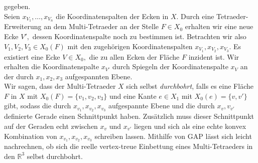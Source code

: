 \documentclass[12pt,titlepage,twoside,cleardoublepage]{article}
\theoremstyle{nummermitklammern}
\numberwithin{equation}{section}
\begin{document}
gegeben.\\
Seien $x_{V_1},\ldots,x_{V_n}$ die Koordinatenspalten der Ecken in $X.$
Durch eine Tetraeder-Erweiterung an dem Multi-Tetraeder an der Stelle $F\in X_0$ erhalten wir eine neue Ecke $V',$ dessen Koordinatenspalte noch zu bestimmen ist. 
Betrachten wir also $V_1,V_2,V_3\in X_0(F)$ mit den zugehörigen Koordinatenspalten $x_{V_1},x_{V_2},x_{V_3}.$ Es existiert eine Ecke $V\in X_0,$ die zu allen Ecken der Fläche $F$ inzident ist. Wir erhalten die Koordinatenspalte $x_{V'}$ durch Spiegeln der Koordinatenspalte $x_V$ an der durch $x_{1},x_{2},x_{3}$ aufgespannten Ebene. \\
Wir sagen, dass der Multi-Tetraeder $X$ sich selbst \emph{durchbohrt}, falls es eine Fläche $F$ in $X$ mit $X_0(F)=\{v_1,v_2,v_3\}$ und eine Kante $e\in X_1$ mit $X_0(e)=\{v,v'\}$ gibt, sodass die durch $x_{v_1},x_{v_2},x_{v_3}$ aufgespannte Ebene und die durch $x_v,v_{v'}$ definierte Gerade  einen Schnittpunkt haben. Zusätzlich muss dieser Schnittpunkt auf der Geraden echt zwischen $x_{v}$ und $x_{v'}$ liegen und sich als eine echte konvex Kombination von $x_{v_1},x_{v_2},x_{v_3}$ schreiben lassen. 
Mithilfe von GAP lässt sich leicht nachrechnen, ob sich die reelle vertex-treue Einbettung eines Multi-Tetraeders in den $\mathbb{R}^3$ selbst durchbohrt.
\end{document}

